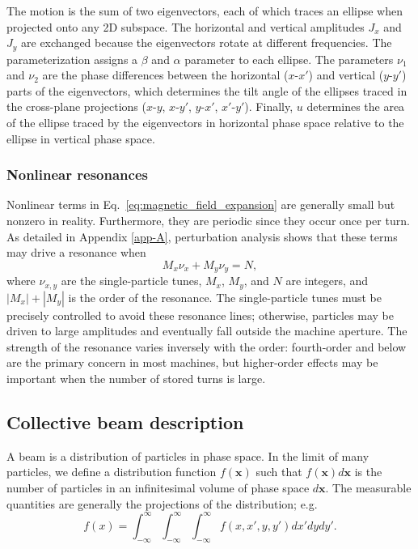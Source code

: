 %
The motion is the sum of two eigenvectors, each of which traces an ellipse when projected onto any 2D subspace. The horizontal and vertical amplitudes $J_x$ and $J_y$ are exchanged because the eigenvectors rotate at different frequencies. The parameterization assigns a $\beta$ and $\alpha$ parameter to each ellipse. The parameters $\nu_1$ and $\nu_2$ are the phase differences between the horizontal ($x$-$x'$) and vertical ($y$-$y'$) parts of the eigenvectors, which determines the tilt angle of the ellipses traced in the cross-plane projections ($x$-$y$, $x$-$y'$, $y$-$x'$, $x'$-$y'$). Finally, $u$ determines the area of the ellipse traced by the eigenvectors in horizontal phase space relative to the ellipse in vertical phase space. 


\subsubsection{Nonlinear resonances}

Nonlinear terms in Eq.~\eqref{eq:magnetic_field_expansion} are generally small but nonzero in reality. Furthermore, they are periodic since they occur once per turn. As detailed in Appendix \ref{app-A}, perturbation analysis shows that these terms may drive a resonance when 
%
\begin{equation}\label{eq:resonance_lines}
    M_x \nu_x + M_y \nu_y = N,
\end{equation}
%
where $\nu_{x, y}$ are the single-particle tunes, $M_x$, $M_y$, and $N$ are integers, and $|M_x| + |M_y|$ is the order of the resonance. The single-particle tunes must be precisely controlled to avoid these resonance lines; otherwise, particles may be driven to large amplitudes and eventually fall outside the machine aperture. The strength of the resonance varies inversely with the order: fourth-order and below are the primary concern in most machines, but higher-order effects may be important when the number of stored turns is large. 



\subsection{Collective beam description}

A beam is a distribution of particles in phase space. In the limit of many particles, we define a distribution function $f(\mathbf{x})$ such that $f(\mathbf{x}) d\mathbf{x}$ is the number of particles in an infinitesimal volume of phase space $d\mathbf{x}$. The measurable quantities are generally the projections of the distribution; e.g.
%
\begin{equation}
    f(x) = 
    \int_{-\infty}^{\infty}
    \int_{-\infty}^{\infty}
    \int_{-\infty}^{\infty}
    f(x, x', y, y') dx' dy dy'.
\end{equation}
%


